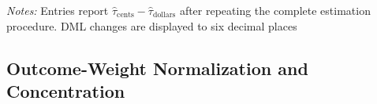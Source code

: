 \documentclass[12pt, a4paper, oneside]{article}
\theoremstyle{plain}
\theoremstyle{definition}
\begin{document}
\begin{table}[H]
\begin{threeparttable}
\begin{tabular}{@{}lrrrr@{}}
\bottomrule
\end{tabular}

\begin{tablenotes}
\footnotesize
\item \textit{Notes:} Entries report
\(\widehat{\tau}_{\mathrm{cents}}-
\widehat{\tau}_{\mathrm{dollars}}\)
after repeating the complete estimation procedure.  DML changes are displayed
to six decimal places
\end{tablenotes}
\end{threeparttable}
\end{table}





\subsection{Outcome-Weight Normalization and Concentration}
\label{subsec:card_weight_diagnostics}
\end{document}
